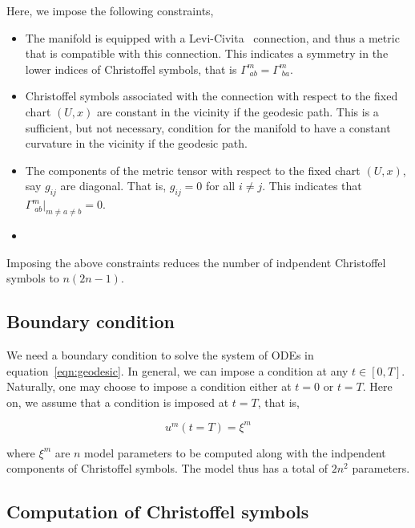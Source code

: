 \documentclass{article}
\begin{document}
Here, we impose the following constraints,

\begin{itemize}
    \item The manifold is equipped with a
      Levi-Civita~\cite{deFelice-1990} connection, and thus a metric
      that is compatible with this connection. This indicates a
      symmetry in the lower indices of Christoffel symbols, that is
      $\Gamma^{m}_{\;ab} = \Gamma^{m}_{\;ba}$.
    \item Christoffel symbols associated with the connection with
      respect to the fixed chart $(U,x)$ are constant in the vicinity
      if the geodesic path. This is a sufficient, but not necessary,
      condition for the manifold to have a constant curvature in the
      vicinity if the geodesic path.
    \item The components of the metric tensor with respect to the
      fixed chart $(U,x)$, say $g_{ij}$ are diagonal. That is, $g_{ij}
      = 0$ for all $i \neq j$. This indicates that
      $\Gamma^{m}_{\;ab}|_{m \ne a \ne b} = 0$.
    \item 
\end{itemize}

Imposing the above constraints reduces the number of indpendent
Christoffel symbols to $n(2n-1)$.

\subsection{Boundary condition}
\label{subsection:boundary-conditions}

We need a boundary condition to solve the system of ODEs in
equation~\ref{eqn:geodesic}. In general, we can impose a condition at
any $t \in [0,T]$. Naturally, one may choose to impose a condition either
at $t = 0$ or $t = T$. Here on, we assume that a condition is imposed
at $t = T$, that is,

\begin{equation}\label{eqn:geodesic-bc}
u^{m}(t = T) = \xi^{m}
\end{equation}

where $\xi^{m}$ are $n$ model parameters to be computed along with the
indpendent components of Christoffel symbols. The model thus has a
total of $2n^2$ parameters.

\subsection{Computation of Christoffel symbols}
\label{subsection:computation}
\end{document}
